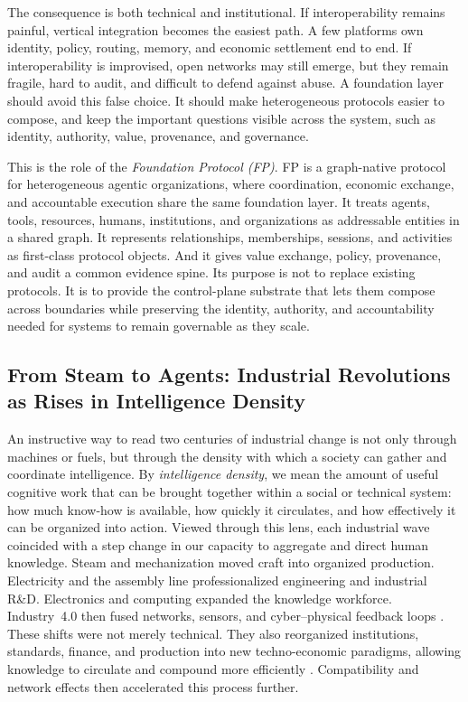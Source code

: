 \documentclass{llmxive}
\begin{document}
The consequence is both technical and institutional. If interoperability remains painful, vertical integration becomes the easiest path. A few platforms own identity, policy, routing, memory, and economic settlement end to end. If interoperability is improvised, open networks may still emerge, but they remain fragile, hard to audit, and difficult to defend against abuse. A foundation layer should avoid this false choice. It should make heterogeneous protocols easier to compose, and keep the important questions visible across the system, such as identity, authority, value, provenance, and governance.

This is the role of the \emph{Foundation Protocol (FP)}. FP is a graph-native protocol for heterogeneous agentic organizations, where coordination, economic exchange, and accountable execution share the same foundation layer. It treats agents, tools, resources, humans, institutions, and organizations as addressable entities in a shared graph. It represents relationships, memberships, sessions, and activities as first-class protocol objects. And it gives value exchange, policy, provenance, and audit a common evidence spine.
Its purpose is not to replace existing protocols. It is to provide the control-plane substrate that lets them compose across boundaries while preserving the identity, authority, and accountability needed for systems to remain governable as they scale.


\subsection{From Steam to Agents: Industrial Revolutions as Rises in Intelligence Density}
\label{subsec:intel-density}

An instructive way to read two centuries of industrial change is not only through machines or fuels, but through the density with which a society can gather and coordinate intelligence. By \emph{intelligence density}, we mean the amount of useful cognitive work that can be brought together within a social or technical system: how much know-how is available, how quickly it circulates, and how effectively it can be organized into action. Viewed through this lens, each industrial wave coincided with a step change in our capacity to aggregate and direct human knowledge. Steam and mechanization moved craft into organized production. Electricity and the assembly line professionalized engineering and industrial R\&D. Electronics and computing expanded the knowledge workforce. Industry~4.0 then fused networks, sensors, and cyber--physical feedback loops \cite{schwab2016fourth,hermann2016industrie}. These shifts were not merely technical. They also reorganized institutions, standards, finance, and production into new techno-economic paradigms, allowing knowledge to circulate and compound more efficiently \cite{perez2002technological}. Compatibility and network effects then accelerated this process further\cite{katz1985network}.
\end{document}
